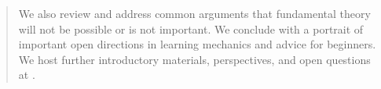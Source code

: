 \begin{abstract}
We also review and address common arguments that fundamental theory will not be possible or is not important.
We conclude with a portrait of important open directions in learning mechanics and advice for beginners.
We host further introductory materials, perspectives, and open questions at \websiteurl.

















\end{abstract}


